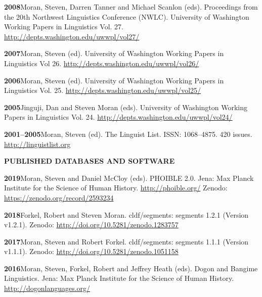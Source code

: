 \documentclass[11pt]{article}
\newcommand{\hangpara}{
 \setlength{\parindent}{0in} %
 \hangindent=0.42in %
}
\begin{document}
\vskip 6pt
\hangpara
{\bf 2008}\hspace{1ex}Moran, Steven, Darren Tanner and Michael Scanlon (eds). Proceedings from the 20th Northwest Linguistics Conference (NWLC). University of Washington Working Papers in Linguistics Vol. 27. \url{http://depts.washington.edu/uwwpl/vol27/}

\vskip 6pt
\hangpara
{\bf 2007}\hspace{1ex}Moran, Steven (ed). University of Washington Working Papers in Linguistics Vol 26. \url{http://depts.washington.edu/uwwpl/vol26/}

\vskip 6pt
\hangpara
{\bf 2006}\hspace{1ex}Moran, Steven (ed). University of Washington Working Papers in Linguistics Vol. 25. \url{http://depts.washington.edu/uwwpl/vol25/}

\vskip 6pt
\hangpara
{\bf 2005}\hspace{1ex}Jinguji, Dan and Steven Moran (eds). University of Washington Working Papers in Linguistics Vol. 24. \url{http://depts.washington.edu/uwwpl/vol24/}

\vskip 6pt
\hangpara
{\bf 2001--2005}\hspace{1ex}Moran, Steven (ed). The Linguist List. ISSN: 1068--4875. 420 issues. \url{http://linguistlist.org}

\vskip 20pt
\begin{flushleft}
{\bf PUBLISHED DATABASES AND SOFTWARE}
\end{flushleft}

\hangpara{\bf 2019}\hspace{1ex}Moran, Steven and Daniel McCloy (eds). PHOIBLE 2.0. Jena: Max Planck Institute for the Science of Human History. \url{http://phoible.org/} Zenodo: \url{https://zenodo.org/record/2593234}

\vskip 6pt
\hangpara{\bf 2018}\hspace{1ex}Forkel, Robert and Steven Moran. cldf/segments: segments 1.2.1 (Version v1.2.1). Zenodo: \url{http://doi.org/10.5281/zenodo.1283757}

\vskip 6pt
\hangpara{\bf 2017}\hspace{1ex}Moran, Steven and Robert Forkel. cldf/segments: segments 1.1.1 (Version v1.1.1). Zenodo: \url{http://doi.org/10.5281/zenodo.1051158}

\vskip 6pt
\hangpara{\bf 2016}\hspace{1ex}Moran, Steven, Forkel, Robert and Jeffrey Heath (eds). Dogon and Bangime Linguistics. Jena: Max Planck Institute for the Science of Human History. \url{http://dogonlanguages.org/}
\end{document}
